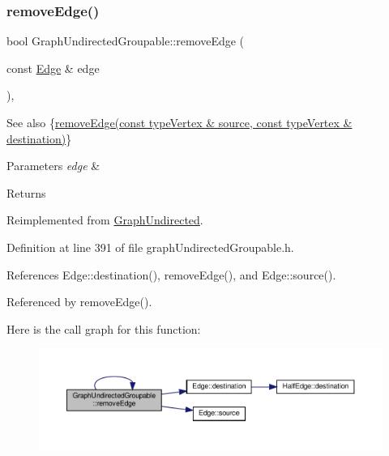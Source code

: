 \subsubsection{\texorpdfstring{remove\+Edge()}{removeEdge()}\hspace{0.1cm}{\footnotesize\ttfamily [2/2]}}
{\footnotesize\ttfamily bool Graph\+Undirected\+Groupable\+::remove\+Edge (\begin{DoxyParamCaption}\item[{const \hyperlink{classEdge}{Edge} \&}]{edge }\end{DoxyParamCaption})\hspace{0.3cm}{\ttfamily [inline]}, {\ttfamily [virtual]}}

\begin{DoxySeeAlso}{See also}
\{\hyperlink{classGraphUndirectedGroupable_ad1a488cc292d7e63d289f598aeaaacd6}{remove\+Edge(const type\+Vertex \& source, const type\+Vertex \& destination)}\} 
\end{DoxySeeAlso}

\begin{DoxyParams}{Parameters}
{\em edge} & \\
\hline
\end{DoxyParams}
\begin{DoxyReturn}{Returns}

\end{DoxyReturn}


Reimplemented from \hyperlink{classGraphUndirected_ad39275e7a8f7a39734916b8c5400a1d6}{Graph\+Undirected}.



Definition at line 391 of file graph\+Undirected\+Groupable.\+h.



References Edge\+::destination(), remove\+Edge(), and Edge\+::source().



Referenced by remove\+Edge().

Here is the call graph for this function\+:\nopagebreak
\begin{figure}[H]
\begin{center}
\leavevmode
\includegraphics[width=350pt]{classGraphUndirectedGroupable_a88e02e4e05f304b289558922f1cb6aa1_cgraph}
\end{center}
\end{figure}
\mbox{\label{classGraphUndirectedGroupable_ad2685678f448028f17c7627634659f7c}} 
